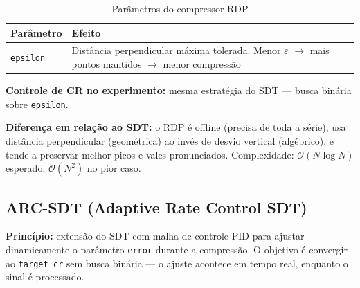 \documentclass[12pt, a4paper]{article}
\begin{document}
\begin{table}[H]
\centering
\caption{Parâmetros do compressor RDP}
\begin{tabular}{lp{9cm}}
\toprule
\textbf{Parâmetro} & \textbf{Efeito} \\
\midrule
\texttt{epsilon} & Distância perpendicular máxima tolerada. Menor $\varepsilon$ $\to$ mais pontos mantidos $\to$ menor compressão \\
\bottomrule
\end{tabular}
\end{table}

\textbf{Controle de CR no experimento:} mesma estratégia do SDT — busca binária sobre \texttt{epsilon}.

\textbf{Diferença em relação ao SDT:} o RDP é offline (precisa de toda a série), usa distância perpendicular (geométrica) ao invés de desvio vertical (algébrico), e tende a preservar melhor picos e vales pronunciados. Complexidade: $\mathcal{O}(N \log N)$ esperado, $\mathcal{O}(N^2)$ no pior caso.

\subsection{ARC-SDT (Adaptive Rate Control SDT)}

\textbf{Princípio:} extensão do SDT com malha de controle PID para ajustar dinamicamente o parâmetro \texttt{error} durante a compressão. O objetivo é convergir ao \texttt{target\_cr} sem busca binária — o ajuste acontece em tempo real, enquanto o sinal é processado.
\end{document}
